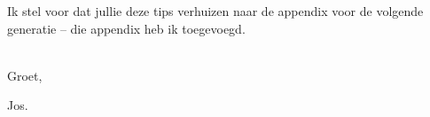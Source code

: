 \documentclass{2wa40summary}
\begin{document}
		Ik stel voor dat jullie deze tips verhuizen naar de appendix voor de volgende generatie -- die appendix heb ik toegevoegd.
		
		\ \\
		Groet,
		
		Jos.
		
%		
		\newpage
			\printindex
		
\end{document}
